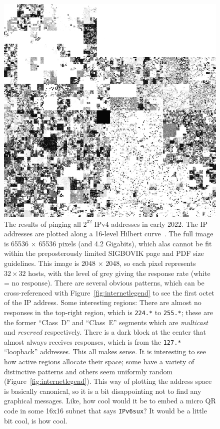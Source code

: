 \documentclass[twocolumn]{article}
\begin{document}
\begin{figure}[tp]
\includegraphics[width=\textwidth]{internet}
\caption{ The results of pinging all $2^{32}$ IPv4 addresses in early
  2022. The IP addresses are plotted along a 16-level Hilbert
  curve~\cite{hilbert1891ueber}. The full image is 65536 $\times$ 65536
  pixels (and 4.2 Gigabits), which alas cannot be fit within the
  preposterously limited SIGBOVIK page and PDF size guidelines. This
  image is 2048 $\times$ 2048, so each pixel represents $32 \times 32$
  hosts, with the level of grey giving the response rate (white = no
  response). There are several obvious patterns, which can be
  cross-referenced with Figure~\ref{fig:internetlegend} to see the
  first octet of the IP address. Some interesting regions: There are
  almost no responses in the top-right region, which is {\tt 224.*} to
  {\tt 255.*}; these are the former ``Class~D'' and ``Class~E''
  segments which are {\it multicast} and {\it reserved} respectively.
  There is a dark block at the center that almost always receives
  responses, which is from the {\tt 127.*} ``loopback'' addresses. This
  all makes sense. It is interesting to see how active regions allocate
  their space; some have a variety of distinctive patterns and others
  seem uniformly random (Figure~\ref{fig:internetlegend}).
%
  This way of plotting the address space is basically canonical, so it
  is a bit disappointing not to find any graphical messages. Like,
  how cool would it be to embed a micro QR code in some 16x16 subnet
  that says {\tt IPv6sux}? It would be a little bit cool, is how cool.
} \label{fig:internet}
\end{figure}
\end{document}
